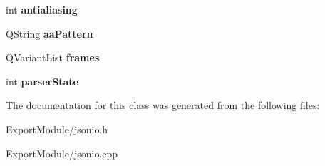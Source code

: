 \begin{DoxyCompactItemize}
\item 
\hypertarget{class_j_son_i_o_afb4f04c6e049e500f8fcfd50eac86305}{
int {\bfseries antialiasing}}
\label{class_j_son_i_o_afb4f04c6e049e500f8fcfd50eac86305}

\item 
\hypertarget{class_j_son_i_o_acab77badbeb5bbf4724aeb9eb1db6b77}{
\-Q\-String {\bfseries aa\-Pattern}}
\label{class_j_son_i_o_acab77badbeb5bbf4724aeb9eb1db6b77}

\item 
\hypertarget{class_j_son_i_o_a700d63a7e45b361fb873f1b7c25176ab}{
\-Q\-Variant\-List {\bfseries frames}}
\label{class_j_son_i_o_a700d63a7e45b361fb873f1b7c25176ab}

\item 
\hypertarget{class_j_son_i_o_a9c9791a0f0747954b16726e1ba9a9b64}{
int {\bfseries parser\-State}}
\label{class_j_son_i_o_a9c9791a0f0747954b16726e1ba9a9b64}

\end{DoxyCompactItemize}


\-The documentation for this class was generated from the following files\-:\begin{DoxyCompactItemize}
\item 
\-Export\-Module/jsonio.\-h\item 
\-Export\-Module/jsonio.\-cpp\end{DoxyCompactItemize}
